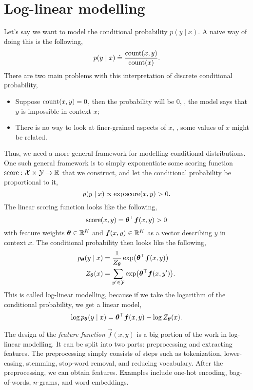 \section{Log-linear modelling} \label{sec:log-linear-modelling}

Let's say we want to model the conditional probability $p(y\mid x)$. A naive
way of doing this is the following, \[
  p(y\mid x) \doteq \frac{\mathrm{count}(x,y)}{\mathrm{count}(x)}
.\]
There are two main problems with this interpretation of discrete conditional
probability,
\begin{itemize}
  \item Suppose $\mathrm{count}(x,y)=0$, then the probability will be $0$, \ie,
    the model says that $y$ is impossible in context $x$;
  \item There is no way to look at finer-grained aspects of $x$, \ie, some
    values of $x$ might be related.
\end{itemize}

Thus, we need a more general framework for modelling conditional distributions.
One such general framework is to simply exponentiate some scoring function
$\mathrm{score}: \mathcal{X} \times \mathcal{Y} \to \mathbb{R}$ that we construct, and let the conditional
probability be proportional to it, \[
  p(y\mid x) \propto \exp \mathrm{score}(x, y) > 0
.\]
The linear scoring function looks like the following, \[
  \mathrm{score}(x,y) = \bm{\theta}^\top \bm{f}(x, y) > 0
\]
with feature weights $\bm{\theta}\in\mathbb{R}^K$ and $\bm{f}(x,y)\in\mathbb{R}^K$ as a
vector describing $y$ in context $x$. The conditional probability then looks
like the following,
\begin{align*}
  p_{\vec{\theta}}(y\mid x) &= \frac{1}{Z_{\vec{\theta}}} \exp \lft( \transpose{\vec{\theta}} \vec{f}(x,y) \rgt) \\
  Z_{\vec{\theta}}(x) &= \sum_{y'\in\mathcal{Y}} \exp \lft( \transpose{\vec{\theta}} \vec{f}(x,y') \rgt)
.\end{align*}
This is called log-linear modelling, because if we take the logarithm of the
conditional probability, we get a linear model, \[
  \log p_{\bm{\theta}}(y \mid x) = \bm{\theta}^\top \bm{f}(x,y) - \log Z_{\bm{\theta}}(x)
.\]

The design of the \textit{feature function} $\vec{f}(x,y)$ is a big portion of
the work in log-linear modelling. It can be split into two parts: preprocessing
and extracting features. The preprocessing simply consists of steps such as tokenization,
lower-casing, stemming, stop-word removal, and reducing vocabulary. After the
preprocessing, we can obtain features. Examples include one-hot encoding,
bag-of-words, $n$-grams, and word embeddings.

